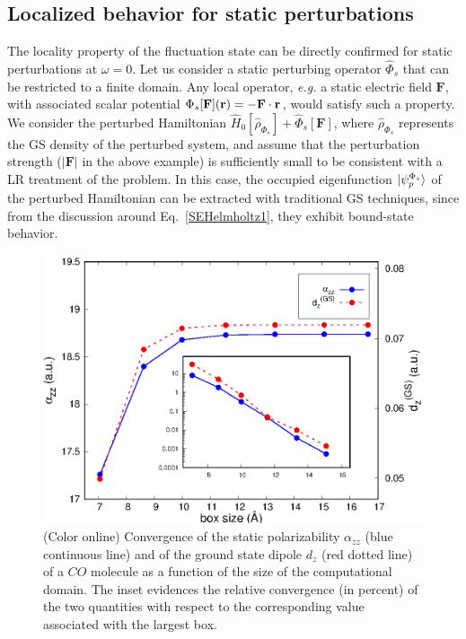 \documentclass[reprint,aps,prb]{revtex4-1}
\renewcommand{\r}{{\bf r}}
\newcommand{\op}[1]{\hat {#1}}
\newcommand{\dm}{\op{\rho}}
\newcommand{\hnot}{\op{H}_0}
\begin{document}
\subsection{Localized behavior for static perturbations}
The locality property of the fluctuation state can be directly confirmed for static perturbations at $\omega=0$.
Let us consider a static perturbing operator $\op\Phi_s$ that can be restricted to a finite domain.
Any local operator, \emph{e.g.} a static electric field $\mathbf F$, with associated scalar potential $\Phi_s[\mathbf F](\r) = -\mathbf F \cdot \r$, would satisfy such a property.
We consider the perturbed Hamiltonian $\hnot[\dm_{\Phi_s}] + \op\Phi_s[\mathbf F]$, where $\dm_{\Phi_s}$ represents the GS density of the perturbed system, and assume that the
perturbation strength ($|\mathbf F|$ in the above example) is sufficiently small to be consistent with a LR treatment of the problem.
In this case, the occupied eigenfunction $\ket{\psi_p^{\Phi_s}}$ of the perturbed Hamiltonian can be extracted with traditional GS techniques,
since from the discussion around Eq.~\eqref{SEHelmholtz1}, they exhibit bound-state behavior.
\begin{figure}[t]
\includegraphics[scale=0.68]{Fig1_CO_statPolvsBox.eps}
\caption{\label{co_alphaStatic}(Color online) Convergence of the static polarizability $\alpha_{zz}$ (blue continuous line) and of the ground state dipole $d_z$ (red dotted line)
of a $CO$ molecule as a function of the size of the computational domain. The inset evidences the relative convergence (in percent) of the two quantities with respect to the corresponding value associated with the largest
box.}
\end{figure}
\end{document}
